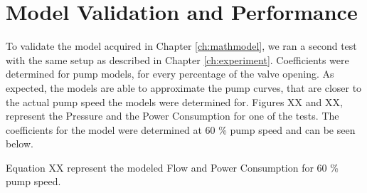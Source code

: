 \chapter{Model Validation and Performance}\label{ch:modValPerf}

To validate the model acquired in Chapter \ref{ch:mathmodel}, we ran a second test with the 
same setup as described in Chapter \ref{ch:experiment}. Coefficients were determined for pump models,
for every percentage of the valve opening. As expected, the models are able to approximate the pump
curves, that are closer to the actual pump speed the models were determined for.
Figures XX and XX, represent the Pressure and the Power Consumption for one of the tests.
The coefficients for the model were determined at 60 \% pump speed and can be seen below.

Equation XX represent the modeled Flow and Power Consumption for 60 \% pump speed.
